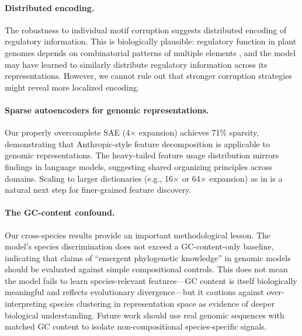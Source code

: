 \documentclass{article}
\begin{document}
\paragraph{Distributed encoding.}
The robustness to individual motif corruption suggests distributed encoding of regulatory information. This is biologically plausible: regulatory function in plant genomes depends on combinatorial patterns of multiple elements \citep{lelli2012disentangling}, and the model may have learned to similarly distribute regulatory information across its representations. However, we cannot rule out that stronger corruption strategies might reveal more localized encoding.

\paragraph{Sparse autoencoders for genomic representations.}
Our properly overcomplete SAE (4$\times$ expansion) achieves 71\% sparsity, demonstrating that Anthropic-style feature decomposition \citep{bricken2023monosemanticity} is applicable to genomic representations. The heavy-tailed feature usage distribution mirrors findings in language models, suggesting shared organizing principles across domains. Scaling to larger dictionaries (e.g., 16$\times$ or 64$\times$ expansion) as in \citet{templeton2024scaling} is a natural next step for finer-grained feature discovery.

\paragraph{The GC-content confound.}
Our cross-species results provide an important methodological lesson. The model's species discrimination does not exceed a GC-content-only baseline, indicating that claims of ``emergent phylogenetic knowledge'' in genomic models should be evaluated against simple compositional controls. This does not mean the model fails to learn species-relevant features---GC content is itself biologically meaningful and reflects evolutionary divergence---but it cautions against over-interpreting species clustering in representation space as evidence of deeper biological understanding. Future work should use real genomic sequences with matched GC content to isolate non-compositional species-specific signals.
\end{document}
